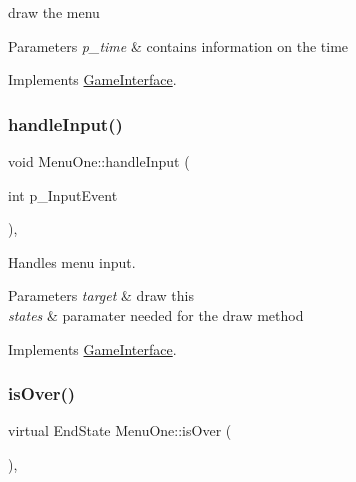 draw the menu 


\begin{DoxyParams}{Parameters}
{\em p\+\_\+time} & contains information on the time \\
\hline
\end{DoxyParams}


Implements \mbox{\hyperlink{class_game_interface_ab33712e6b22b934982896ea0cab1699a}{Game\+Interface}}.

\mbox{\label{class_menu_one_aee28812124909d8734eeeaecfde35f0f}} 
\subsubsection{\texorpdfstring{handle\+Input()}{handleInput()}}
{\footnotesize\ttfamily void Menu\+One\+::handle\+Input (\begin{DoxyParamCaption}\item[{int}]{p\+\_\+\+Input\+Event }\end{DoxyParamCaption})\hspace{0.3cm}{\ttfamily [override]}, {\ttfamily [virtual]}}



Handles menu input. 


\begin{DoxyParams}{Parameters}
{\em target} & draw this \\
\hline
{\em states} & paramater needed for the draw method \\
\hline
\end{DoxyParams}


Implements \mbox{\hyperlink{class_game_interface_a48b4f6059c14c79359d30b77016a28f0}{Game\+Interface}}.

\mbox{\label{class_menu_one_aa1d50806994903b77d44d241d7755404}} 
\subsubsection{\texorpdfstring{is\+Over()}{isOver()}}
{\footnotesize\ttfamily virtual End\+State Menu\+One\+::is\+Over (\begin{DoxyParamCaption}{ }\end{DoxyParamCaption})\hspace{0.3cm}{\ttfamily [override]}, {\ttfamily [virtual]}}



